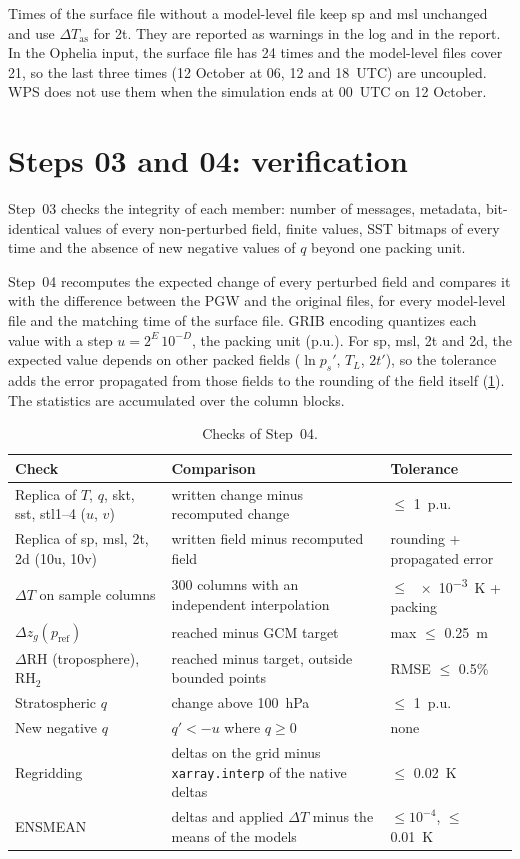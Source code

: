 \documentclass[11pt,a4paper]{article}
\newcommand{\code}[1]{\texttt{#1}}
\newcommand{\dT}{\Delta T}
\newcommand{\dRH}{\Delta \mathrm{RH}}
\begin{document}
Times of the surface file without a model-level file keep sp and msl
unchanged and use $\Delta T_{\mathrm{as}}$ for 2t. They are reported as
warnings in the log and in the report. In the Ophelia input, the surface file
has 24 times and the model-level files cover 21, so the last three times
(12 October at 06, 12 and 18~UTC) are uncoupled. WPS does not use them when
the simulation ends at 00~UTC on 12 October.

\section{Steps 03 and 04: verification}
\label{sec:verif}

Step~03 checks the integrity of each member: number of messages, metadata,
bit-identical values of every non-perturbed field, finite values, SST
bitmaps of every time and the absence of new negative values of $q$ beyond
one packing unit.

Step~04 recomputes the expected change of every perturbed field and compares
it with the difference between the PGW and the original files, for every
model-level file and the matching time of the surface file. GRIB encoding
quantizes each value with a step $u = 2^{E}\,10^{-D}$, the packing unit
(p.u.). For sp, msl, 2t and 2d, the expected value depends on other packed
fields ($\ln p_s'$, $T_L$, $2t'$), so the tolerance adds the error propagated
from those fields to the rounding of the field itself (\cref{tab:checks}).
The statistics are accumulated over the column blocks.

\begin{table}[htbp]
\centering
\caption{Checks of Step~04.}
\label{tab:checks}
\small
\begin{tabularx}{\linewidth}{lXl}
\toprule
Check & Comparison & Tolerance \\
\midrule
Replica of $T$, $q$, skt, sst, stl1--4 ($u$, $v$) & written change minus
  recomputed change & $\le$ \SI{1}{p.u.} \\
Replica of sp, msl, 2t, 2d (10u, 10v) & written field minus recomputed field &
  rounding + propagated error \\
$\dT$ on sample columns & 300 columns with an independent interpolation & $\le$ \SI{e-3}{K} + packing \\
$\Delta z_g(p_{\mathrm{ref}})$ & reached minus GCM target & max $\le$ \SI{0.25}{m} \\
$\dRH$ (troposphere), $\mathrm{RH}_2$ & reached minus target, outside bounded points & RMSE $\le$ 0.5\% \\
Stratospheric $q$ & change above \SI{100}{hPa} & $\le$ \SI{1}{p.u.} \\
New negative $q$ & $q' < -u$ where $q \ge 0$ & none \\
Regridding & deltas on the grid minus \code{xarray.interp} of the native deltas & $\le$ \SI{0.02}{K} \\
ENSMEAN & deltas and applied $\dT$ minus the means of the models & $\le 10^{-4}$, $\le$ \SI{0.01}{K} \\
\bottomrule
\end{tabularx}
\end{table}
\end{document}
